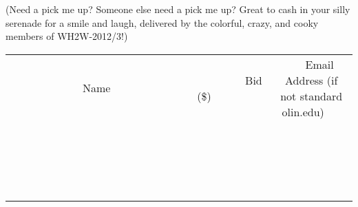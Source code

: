 \documentclass[11pt]{article}
\begin{document}
(Need a pick me up?  Someone else need a pick me up?  Great to cash in your silly serenade for a smile and laugh, delivered by the colorful, crazy, and cooky members of WH2W-2012/3!)
\\[3ex]
\begin{tabular}{c c c}
~~~~~~~~~~~~~Name~~~~~~~~~~~~~ & ~~~~~~~~~Bid (\$)~~~~~~~~~  & ~~~Email Address (if not standard olin.edu)~~~\\
 & & \\
\hline
 & & \\
\hline
 & & \\
\hline
 & & \\
\hline
 & & \\
\hline
 & & \\
\hline
 & & \\
\hline
 & & \\
\hline
 & & \\
\hline
 & & \\
\hline
 & & \\
\hline
 & & \\
\hline
 & & \\
\hline
 & & \\
\hline
 & & \\
\hline
 & & \\
\hline
 & & \\
\hline
 & & \\
\hline
 & & \\
\hline
\end{tabular}
\newpage
\end{document}
